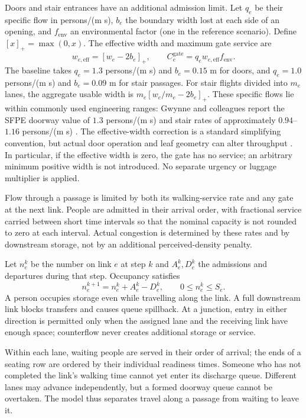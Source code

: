 \documentclass[11pt,a4paper]{article}
\begin{document}
Doors and stair entrances have an additional admission limit. Let $q_e$ be their specific flow in persons/(m s), $b_e$ the boundary width lost at each side of an opening, and $f_{\mathrm{env}}$ an environmental factor (one in the reference scenario). Define $[x]_+=\max(0,x)$. The effective width and maximum gate service are
\begin{equation}\label{eq:gate}
w_{e,\mathrm{eff}}=[w_e-2b_e]_+,
\qquad C_e^{\mathrm{gate}}=q_ew_{e,\mathrm{eff}}f_{\mathrm{env}}.
\end{equation}
The baseline takes $q_e=1.3$ persons/(m s) and $b_e=0.15$ m for doors, and $q_e=1.0$ persons/(m s) and $b_e=0.09$ m for stair passages. For stair flights divided into $m_e$ lanes, the aggregate usable width is $m_e[w_e/m_e-2b_e]_+$. These specific flows lie within commonly used engineering ranges: Gwynne and colleagues report the SFPE doorway value of $1.3$ persons/(m s) and stair rates of approximately $0.94$--$1.16$ persons/(m s) \cite{gwynne}. The effective-width correction is a standard simplifying convention, but actual door operation and leaf geometry can alter throughput \cite{gwynne}. In particular, if the effective width is zero, the gate has no service; an arbitrary minimum positive width is not introduced. No separate urgency or luggage multiplier is applied.

Flow through a passage is limited by both its walking-service rate and any gate at the next link. People are admitted in their arrival order, with fractional service carried between short time intervals so that the nominal capacity is not rounded to zero at each interval. Actual congestion is determined by these rates and by downstream storage, not by an additional perceived-density penalty.

Let $n_e^k$ be the number on link $e$ at step $k$ and $A_e^k,D_e^k$ the admissions and departures during that step. Occupancy satisfies
\begin{equation}\label{eq:occupancy}
n_e^{k+1}=n_e^k+A_e^k-D_e^k,\qquad 0\leq n_e^k\leq S_e.
\end{equation}
A person occupies storage even while travelling along the link. A full downstream link blocks transfers and causes queue spillback. At a junction, entry in either direction is permitted only when the assigned lane and the receiving link have enough space; counterflow never creates additional storage or service.

Within each lane, waiting people are served in their order of arrival; the ends of a seating row are ordered by their individual readiness times. Someone who has not completed the link's walking time cannot yet enter its discharge queue. Different lanes may advance independently, but a formed doorway queue cannot be overtaken. The model thus separates travel along a passage from waiting to leave it.
\end{document}
